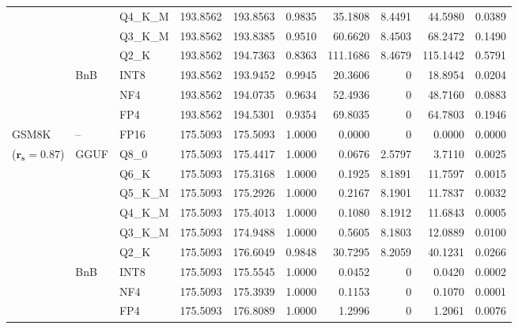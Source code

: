 \begin{table}[t]
{\begin{tabular}{ll l rrrrrrr}
 &  & Q4\_K\_M & 193.8562 & 193.8563 & 0.9835 & 35.1808 & 8.4491 & 44.5980 & 0.0389 \\
 &  & Q3\_K\_M & 193.8562 & 193.8385 & 0.9510 & 60.6620 & 8.4503 & 68.2472 & 0.1490 \\
 &  & Q2\_K & 193.8562 & 194.7363 & \cellcolor{red!18} 0.8363 & \cellcolor{red!18} 111.1686 & 8.4679 & \cellcolor{red!18} 115.1442 & \cellcolor{red!18} 0.5791 \\
 & BnB & INT8 & 193.8562 & 193.9452 & 0.9945 & 20.3606 & \cellcolor{cyan!12} $0$ & 18.8954 & 0.0204 \\
 &  & NF4 & 193.8562 & 194.0735 & 0.9634 & 52.4936 & \cellcolor{cyan!12} $0$ & 48.7160 & 0.0883 \\
 &  & FP4 & 193.8562 & 194.5301 & \cellcolor{red!18} 0.9354 & \cellcolor{red!18} 69.8035 & \cellcolor{cyan!12} $0$ & \cellcolor{red!18} 64.7803 & \cellcolor{red!18} 0.1946 \\
\midrule
GSM8K & -- & FP16 & 175.5093 & 175.5093 & 1.0000 & 0.0000 & \cellcolor{cyan!12} $0$ & 0.0000 & 0.0000 \\
{\small ($\mathbf{r_s{=}0.87}$)} & GGUF & Q8\_0 & 175.5093 & 175.4417 & 1.0000 & 0.0676 & 2.5797 & 3.7110 & 0.0025 \\
 &  & Q6\_K & 175.5093 & 175.3168 & 1.0000 & 0.1925 & 8.1891 & 11.7597 & 0.0015 \\
 &  & Q5\_K\_M & 175.5093 & 175.2926 & 1.0000 & 0.2167 & 8.1901 & 11.7837 & 0.0032 \\
 &  & Q4\_K\_M & 175.5093 & 175.4013 & 1.0000 & 0.1080 & 8.1912 & 11.6843 & 0.0005 \\
 &  & Q3\_K\_M & 175.5093 & 174.9488 & 1.0000 & 0.5605 & 8.1803 & 12.0889 & 0.0100 \\
 &  & Q2\_K & 175.5093 & 176.6049 & 0.9848 & 30.7295 & 8.2059 & 40.1231 & 0.0266 \\
 & BnB & INT8 & 175.5093 & 175.5545 & 1.0000 & 0.0452 & \cellcolor{cyan!12} $0$ & 0.0420 & 0.0002 \\
 &  & NF4 & 175.5093 & 175.3939 & 1.0000 & 0.1153 & \cellcolor{cyan!12} $0$ & 0.1070 & 0.0001 \\
 &  & FP4 & 175.5093 & 176.8089 & 1.0000 & 1.2996 & \cellcolor{cyan!12} $0$ & 1.2061 & 0.0076 \\
\bottomrule
\end{tabular}}
\end{table}